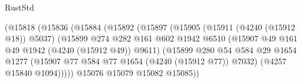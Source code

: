 \begin{lexlean}{RustStd}
\begin{coremodule}
                                            (@15818
                                              (@15836
                                                (@15884
                                                  (@15892
                                                    (@15897
                                                      (@15905
                                                        (@15911 (@4240 (@15912 @18)) @5037)
                                                        (@15899
                                                          @274
                                                          @282
                                                          @161
                                                          @602
                                                          @1942
                                                          @6510
                                                          (@15907
                                                            @49
                                                            @161
                                                            @49
                                                            @1942
                                                            (@4240 (@15912 @49))
                                                            @9611)
                                                          (@15899
                                                            @280
                                                            @54
                                                            @584
                                                            @29
                                                            @1654
                                                            @1277
                                                            (@15907
                                                              @77
                                                              @584
                                                              @77
                                                              @1654
                                                              (@4240 (@15912 @77))
                                                              @7032)
                                                            (@4257 @15840 @1094)))))
                                                    @15076
                                                    @15079
                                                    @15082
                                                    @15085))

\end{coremodule}
\end{lexlean}
